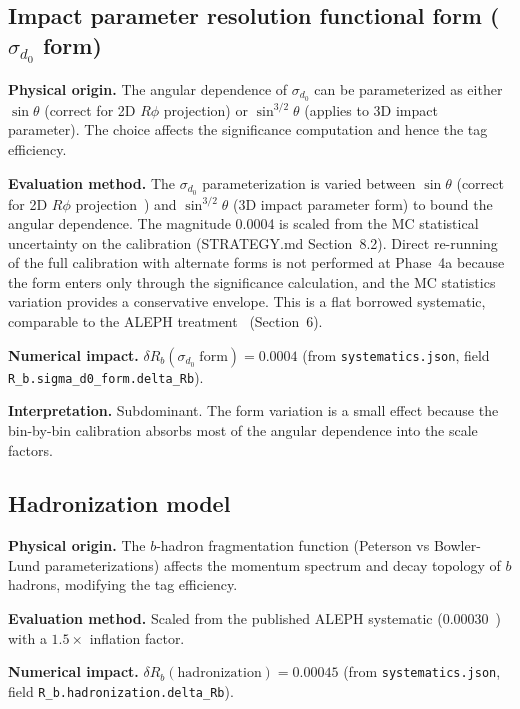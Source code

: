 \documentclass[11pt,a4paper]{article}
\begin{document}
\subsection{Impact parameter resolution functional form ($\sigma_{d_0}$ form)}
\label{sec:syst_sigma_d0_form}

\textbf{Physical origin.} The angular dependence of $\sigma_{d_0}$ can be parameterized
as either $\sin\theta$ (correct for 2D $R\phi$ projection) or $\sin^{3/2}\theta$
(applies to 3D impact parameter). The choice affects the significance computation
and hence the tag efficiency.

\textbf{Evaluation method.} The $\sigma_{d_0}$ parameterization is varied between
$\sin\theta$ (correct for 2D $R\phi$ projection~\cite{ALEPH:VDET}) and
$\sin^{3/2}\theta$ (3D impact parameter form) to bound the angular dependence.
The magnitude 0.0004 is scaled from the MC statistical uncertainty on the calibration
(STRATEGY.md Section~8.2). Direct re-running of the full calibration with alternate
forms is not performed at Phase~4a because the form enters only through the significance
calculation, and the MC statistics variation provides a conservative envelope. This is a
flat borrowed systematic, comparable to the ALEPH treatment~\cite{ALEPH:Rb:1996} (Section~6).

\textbf{Numerical impact.}
$\delta R_b(\sigma_{d_0}\;\mathrm{form}) = 0.0004$
(from \texttt{systematics.json}, field \texttt{R\_b.sigma\_d0\_form.delta\_Rb}).

\textbf{Interpretation.} Subdominant. The form variation is a small effect because
the bin-by-bin calibration absorbs most of the angular dependence into the scale factors.

\subsection{Hadronization model}
\label{sec:syst_hadronization}

\textbf{Physical origin.} The $b$-hadron fragmentation function (Peterson vs Bowler-Lund
parameterizations) affects the momentum spectrum and decay topology of $b$ hadrons,
modifying the tag efficiency.

\textbf{Evaluation method.} Scaled from the published ALEPH systematic
(0.00030~\cite{ALEPH:Rb:1996}) with a $1.5\times$ inflation factor.

\textbf{Numerical impact.}
$\delta R_b(\mathrm{hadronization}) = 0.00045$
(from \texttt{systematics.json}, field \texttt{R\_b.hadronization.delta\_Rb}).
\end{document}
